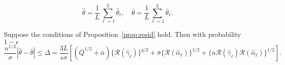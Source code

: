 \begin{definition}
$$
    \hat{\theta}=\frac{1}{L}\sum_{\ell=1}^L \hat{\theta}_{\ell},\quad 
    \bar{\theta}=\frac{1}{L}\sum_{\ell=1}^L \bar{\theta}_{\ell} .
$$
\end{definition}

\begin{proposition}\label{prop:Delta}
Suppose the conditions of Proposition~\ref{prop:resid} hold. Then with probability $1-\epsilon$
$$
\frac{n^{1/2}}{\sigma}|\hat{\theta}-\bar{\theta}|\leq \Delta= \frac{3L}{\epsilon  \sigma}\left[(\bar{Q}^{1/2}+\bar{\alpha})\{\mathcal{R}(\hat{\gamma}_{\ell})\}^{q/2}+\bar{\sigma}\{\mathcal{R}(\hat{\alpha}_{\ell})\}^{1/2}+ \{n\mathcal{R}(\hat{\gamma}_{\ell})\mathcal{R}(\hat{\alpha}_{\ell})\}^{1/2}\right].
$$
\end{proposition}


